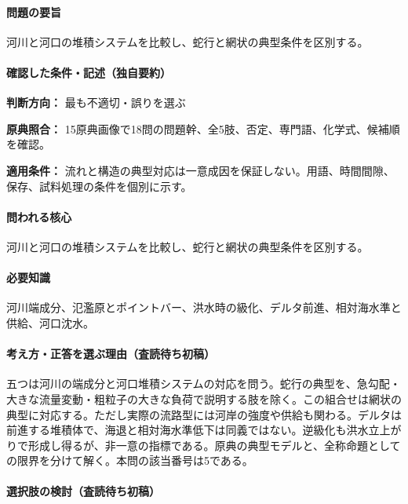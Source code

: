 \paragraph{問題の要旨} 河川と河口の堆積システムを比較し、蛇行と網状の典型条件を区別する。

\paragraph{確認した条件・記述（独自要約）}\mbox{}\par

\noindent\textbf{判断方向：} 最も不適切・誤りを選ぶ\par

\noindent\textbf{原典照合：} 15原典画像で18問の問題幹、全5肢、否定、専門語、化学式、候補順を確認。\par

\noindent\textbf{適用条件：} 流れと構造の典型対応は一意成因を保証しない。用語、時間間隙、保存、試料処理の条件を個別に示す。\par

\paragraph{問われる核心} 河川と河口の堆積システムを比較し、蛇行と網状の典型条件を区別する。

\paragraph{必要知識} 河川端成分、氾濫原とポイントバー、洪水時の級化、デルタ前進、相対海水準と供給、河口沈水。

\paragraph{考え方・正答を選ぶ理由（査読待ち初稿）} 五つは河川の端成分と河口堆積システムの対応を問う。蛇行の典型を、急勾配・大きな流量変動・粗粒子の大きな負荷で説明する肢を除く。この組合せは網状の典型に対応する。ただし実際の流路型には河岸の強度や供給も関わる。デルタは前進する堆積体で、海退と相対海水準低下は同義ではない。逆級化も洪水立上がりで形成し得るが、非一意の指標である。原典の典型モデルと、全称命題としての限界を分けて解く。本問の該当番号は5である。

\paragraph{選択肢の検討（査読待ち初稿）}\mbox{}\par

